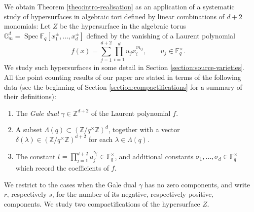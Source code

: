 \documentclass[11pt, reqno]{amsart}
\theoremstyle{plain}
\theoremstyle{definition}
\newcommand{\Z}{\mathbb{Z}}
\newcommand{\F}{\mathbb{F}}
\newcommand{\ga}{\gamma}
\newcommand{\G}{\mathbb{G}}
\newcommand{\Spec}{\operatorname{Spec}}
\begin{document}
We obtain Theorem \ref{theo:intro-realisation} as an application of a systematic study of hypersurfaces in algebraic tori defined by linear combinations of $d+2$ monomials:
Let $Z$ be the hypersurface in  the algebraic torus $\G_m^{d}= \Spec \F_q[x_1^{\pm},\dots,x_{d}^{\pm}]$ defined by the vanishing of a Laurent polynomial 
\[
f(x) = \sum_{j=1}^{d+2} \prod_{i=1}^{d} u_jx_i^{m_{ij}}, \qquad u_{j} \in \F_q^\times.
\]
We study such hypersurfaces in some detail in Section \ref{section:source-varieties}.
All the point counting results of our paper are stated in terms of the following data (see the beginning of Section \ref{section:compactifications} for a summary of their definitions): 
\begin{enumerate}
    \item The \emph{Gale dual} $\gamma \in \Z^{d+2}$ of the Laurent polynomial $f$.
    \item A subset $\Lambda(q) \subset (\Z/q^\times\Z)^{d}$, together with a vector $\delta(\lambda) \in (\Z/q^\times\Z)^{d+2}$ for each $\lambda \in \Lambda(q)$.
    \item The constant $t = \prod_{j=1}^{d+2} u_j^{\gamma_j} \in \F_q^\times$, and additional constants $\sigma_1,\dots,\sigma_{d} \in \F_q^\times$  which record the coefficients of $f$.
\end{enumerate}
We restrict to the cases when the Gale dual $\ga$ has no zero components, and write 
$r$, respectively $s$, for the number of its negative, respectively positive, components. We study two compactifications of the hypersurface $Z$.
\end{document}

